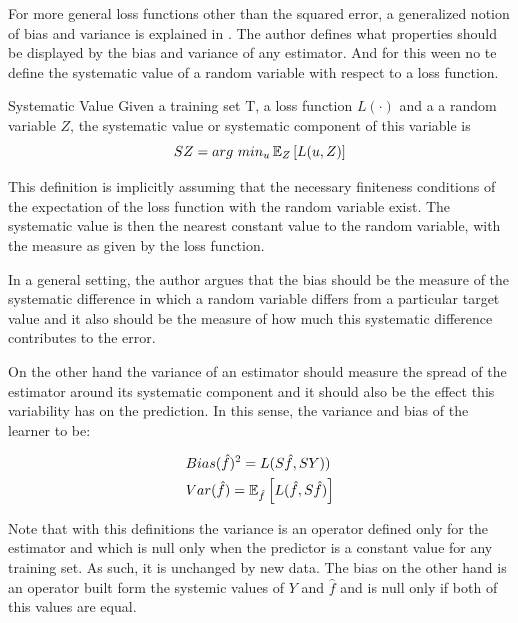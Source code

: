 For more general loss functions other than the squared error, a generalized notion of bias and variance is explained in \textcite{james-biasVarianceGeneral}. The author defines what properties should be displayed by the bias and variance of any estimator. And for this ween no te define the systematic value of a random variable with respect to a loss function.

\begin{definition}{Systematic Value}
Given a training set $\mathrm{T}$, a loss function $L(\cdot)$ and a a random variable $Z$, the systematic value or systematic component of this variable is
$$ SZ  =  arg \ min_u \operatorname{\mathbb{E}}_{Z} \left[ L(u,Z) \right]$$
\end{definition}

This definition is implicitly assuming that the necessary finiteness conditions of the expectation of the loss function with the random variable exist. The systematic value is then the nearest constant value to the random variable, with the measure as given by the loss function.


In a general setting, the author argues that the bias should be the measure of the systematic difference in which a random variable differs from a particular target value and it also should be the measure of how much this systematic difference contributes to the error.

On the other hand the variance of an estimator should measure the spread of the estimator around its systematic component and it should also be the effect this variability has on the prediction. In this sense, the variance and bias of the learner to be:

\begin{equation}
\begin{split}
& Bias(\hat{f})^2 = L(S\hat{f},SY)) \\
& Var(\hat{f}) = \operatorname{\mathbb{E}}_{\hat{f}} \left[  L(\hat{f}  , S\hat{f}) \right]
\end{split}
\end{equation}

Note that with this definitions the variance is an operator defined only for the estimator and which is null only when the predictor is a constant value for any training set. As such, it is unchanged by new data. The bias on the other hand is an operator built form the systemic values of $Y$ and $\hat{f}$ and is null only if both of this values are equal.


